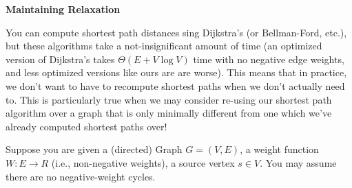 \documentclass{exam}
\theoremstyle{prob}
\begin{document}
\begin{questions}

    \question \textbf{Maintaining Relaxation}

    You can compute shortest path distances sing Dijkstra's (or Bellman-Ford, etc.), but these algorithms take a not-insignificant amount of time (an optimized version of Dijkstra's takes $\Theta(E + V\log V)$ time with no negative edge weights, and less optimized versions like ours are are worse). This means that in practice, we don't want to have to recompute shortest paths when we don't actually need to. This is particularly true when we may consider re-using our shortest path algorithm over a graph that is only minimally different from one which we've already computed shortest paths over! 

    Suppose you are given a (directed) Graph $G = (V, E)$, a weight function $W: E \to R$ (i.e., non-negative weights), a source vertex $s \in V$. You may assume there are no negative-weight cycles.

\end{questions}
\end{document}
